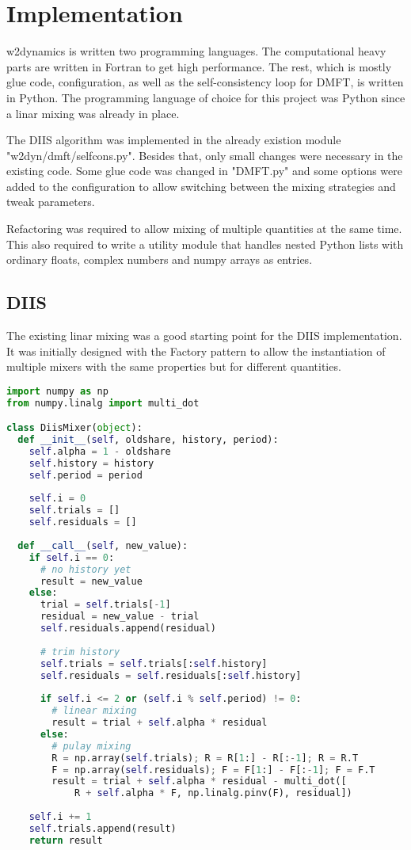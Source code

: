 \chapter{Implementation}
\label{ch:impl}
w2dynamics\cite{w2dyn}\cite{w2dyn_ref} is written two programming languages. The computational heavy parts are written in Fortran to get high performance. The rest, which is mostly glue code, configuration, as well as the self-consistency loop for DMFT, is written in Python. The programming language of choice for this project was Python since a linar mixing was already in place.

The DIIS algorithm was implemented in the already existion module "w2dyn/dmft/selfcons.py". Besides that, only small changes were necessary in the existing code. Some glue code was changed in "DMFT.py" and some options were added to the configuration to allow switching between the mixing strategies and tweak parameters.

Refactoring was required to allow mixing of multiple quantities at the same time. This also required to write a utility module that handles nested Python lists with ordinary floats, complex numbers and numpy arrays as entries.

\section{DIIS}
The existing linar mixing was a good starting point for the DIIS implementation. It was initially designed with the Factory pattern to allow the instantiation of multiple mixers with the same properties but for different quantities.

\begin{lstlisting}[label=lst:diis, language=python, caption=DIIS implementation]
import numpy as np
from numpy.linalg import multi_dot

class DiisMixer(object):
  def __init__(self, oldshare, history, period):
    self.alpha = 1 - oldshare
    self.history = history
    self.period = period
    
    self.i = 0
    self.trials = []
    self.residuals = []
  
  def __call__(self, new_value):
    if self.i == 0:
      # no history yet
      result = new_value
    else:
      trial = self.trials[-1]
      residual = new_value - trial
      self.residuals.append(residual)
      
      # trim history
      self.trials = self.trials[:self.history]
      self.residuals = self.residuals[:self.history]
      
      if self.i <= 2 or (self.i % self.period) != 0:
        # linear mixing
        result = trial + self.alpha * residual
      else:
        # pulay mixing
        R = np.array(self.trials); R = R[1:] - R[:-1]; R = R.T
        F = np.array(self.residuals); F = F[1:] - F[:-1]; F = F.T
        result = trial + self.alpha * residual - multi_dot([
            R + self.alpha * F, np.linalg.pinv(F), residual])
    
    self.i += 1
    self.trials.append(result)
    return result
\end{lstlisting}

